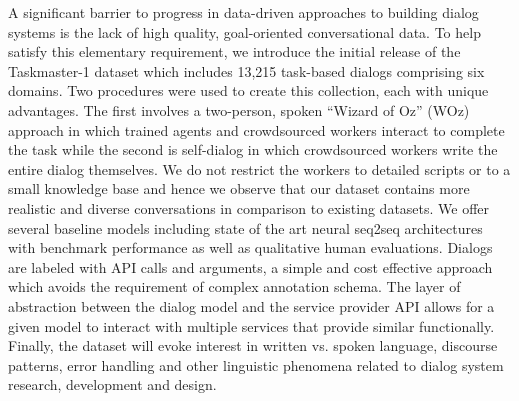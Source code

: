 A significant barrier to progress in data-driven approaches to building dialog systems is the lack of high quality, goal-oriented conversational data. To help satisfy this elementary requirement, we introduce the initial release of the Taskmaster-1 dataset which includes 13,215 task-based dialogs comprising six domains. Two procedures were used to create this collection, each with unique advantages. The first involves a two-person, spoken ``Wizard of Oz'' (WOz) approach in which trained agents and crowdsourced workers interact to complete the task while the second is self-dialog in which crowdsourced workers write the entire dialog themselves. We do not restrict the workers to detailed scripts or to a small knowledge base and hence we observe that our dataset contains more realistic and diverse conversations in comparison to existing datasets. We offer several baseline models including state of the art neural seq2seq architectures with benchmark performance as well as qualitative human evaluations. Dialogs are labeled with API calls and arguments, a simple and cost effective approach which avoids the requirement of complex annotation schema. The layer of abstraction between the dialog model and the service provider API allows for a given model to interact with multiple services that provide similar functionally. Finally, the dataset will evoke interest in written vs. spoken language, discourse patterns, error handling and other linguistic phenomena related to dialog system research, development and design.
